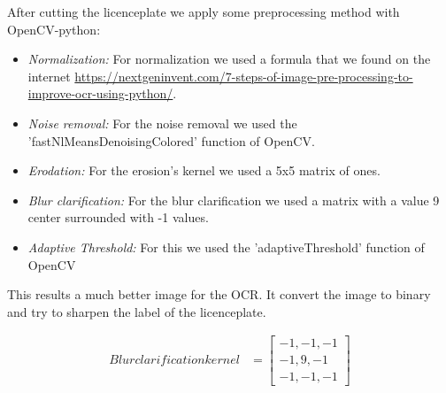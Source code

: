 After cutting the licenceplate we apply some preprocessing method with OpenCV-python:
\begin{itemize}
    \item \emph{Normalization:} For normalization we used a formula that we found on the internet \url{https://nextgeninvent.com/7-steps-of-image-pre-processing-to-improve-ocr-using-python/}.
    \item \emph{Noise removal:} For the noise removal we used the 'fastNlMeansDenoisingColored' function of OpenCV.
    \item \emph{Erodation:} For the erosion's kernel we used a 5x5 matrix of ones.
    \item \emph{Blur clarification:} For the blur clarification we used a matrix with a value 9 center surrounded with -1 values.
    \item \emph{Adaptive Threshold:} For this we used the 'adaptiveThreshold' function of OpenCV
\end{itemize}

This results a much better image for the OCR. It convert the image to binary and try to sharpen the label of the licenceplate. 

\begin{align}
Blur clarification kernel &= \begin{bmatrix}
    -1, -1, -1\\
    -1, 9, -1 \\
    -1, -1, -1
\end{bmatrix}
\end{align}


